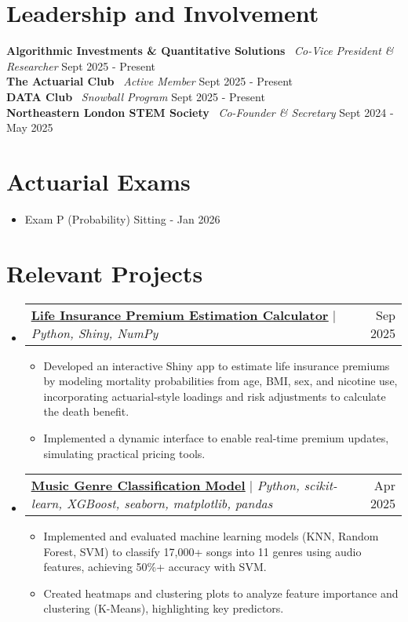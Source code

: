 \documentclass[letterpaper,11pt]{article}
\makeatletter
\newcommand{\resumeItem}[1]{\item\small{#1}}
\newcommand{\resumeProjectHeading}[2]{
  \item
  \begin{tabular*}{1.0\textwidth}{l@{\extracolsep{\fill}}r}
    #1 & #2\\
  \end{tabular*}
}
\newcommand{\resumeSubHeadingListStart}{\begin{itemize}[leftmargin=0in, label={}]}
\newcommand{\resumeSubHeadingListEnd}{\end{itemize}}
\newcommand{\resumeItemListStart}{\begin{itemize}[leftmargin=0.2in, label=$\bullet$]}
\newcommand{\resumeItemListEnd}{\end{itemize}}
\makeatother
\begin{document}
\section{Leadership and Involvement}
{\small \textbf{Algorithmic Investments \& Quantitative Solutions}} \textbar\ \textit{Co-Vice President \& Researcher} \hfill Sept 2025 - Present \\
{\small \textbf{The Actuarial Club}} \textbar\ \textit{Active Member} \hfill Sept 2025 - Present \\
{\small \textbf{DATA Club}} \textbar\ \textit{Snowball Program} \hfill Sept 2025 - Present \\
{\small \textbf{Northeastern London STEM Society}} \textbar\ \textit{Co-Founder \& Secretary} \hfill Sept 2024 - May 2025

\section{Actuarial Exams}
\resumeSubHeadingListStart
    \resumeItemListStart
        \resumeItem{Exam P (Probability) \hfill Sitting -  Jan 2026}
    \resumeItemListEnd
\resumeSubHeadingListEnd

\section{Relevant Projects}
\resumeSubHeadingListStart
\resumeProjectHeading{\href{https://github.com/ollieb216/ollie-baccay/tree/main/shiny}{\textcolor{NavyBlue}{\underline{\textbf{Life Insurance Premium Estimation Calculator}}}} $|$ \textit{Python, Shiny, NumPy} \href{https://github.com/ollieb216/ollie-baccay/tree/main/shiny}{}}{Sep 2025}
    \resumeItemListStart
        \resumeItem{Developed an interactive Shiny app to estimate life insurance premiums by modeling mortality probabilities from age, BMI, sex, and nicotine use, incorporating actuarial-style loadings and risk adjustments to calculate the death benefit.}
        \resumeItem{Implemented a dynamic interface to enable real-time premium updates, simulating practical pricing tools.}
    \resumeItemListEnd

\resumeProjectHeading{\href{https://github.com/ollieb216/Music-Genre-Classifier}{\textcolor{NavyBlue}{\underline{\textbf{Music Genre Classification Model}}}} $|$ \textit{Python, scikit-learn, XGBoost, seaborn, matplotlib, pandas} \href{https://github.com/ollieb216/Music-Genre-Classifier}{}}{Apr 2025}
    \resumeItemListStart
        \resumeItem{Implemented and evaluated machine learning models (KNN, Random Forest, SVM) to classify 17,000+ songs into 11 genres using audio features, achieving 50\%+ accuracy with SVM.}
        \resumeItem{Created heatmaps and clustering plots to analyze feature importance and clustering (K-Means), highlighting key predictors.}
    \resumeItemListEnd
\resumeSubHeadingListEnd
\end{document}

